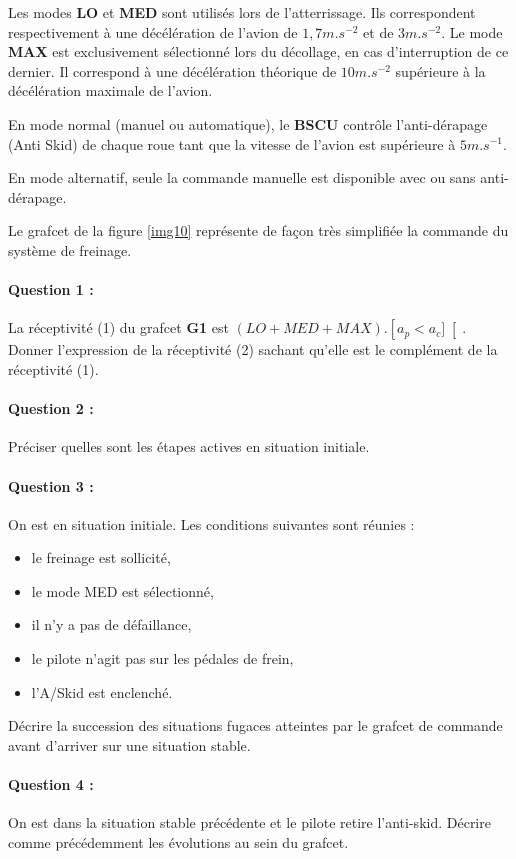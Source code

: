 Les modes \textbf{LO} et \textbf{MED} sont utilisés lors de l'atterrissage. Ils correspondent respectivement à une décélération de l'avion de $1,7m.s^{-2}$ et de $3m.s^{-2}$. Le mode \textbf{MAX} est exclusivement sélectionné lors du décollage, en cas d'interruption de ce dernier. Il correspond à une décélération théorique de $10m.s^{-2}$ supérieure à la décélération maximale de l'avion.

En mode normal (manuel ou automatique), le \textbf{BSCU} contrôle l'anti-dérapage (Anti Skid) de chaque roue tant que la vitesse de l'avion est supérieure à $5m.s^{-1}$.

En mode alternatif, seule la commande manuelle est disponible avec ou sans anti-dérapage.

Le grafcet de la figure \ref{img10} représente de façon très simplifiée la commande du système de freinage.

\paragraph{Question 1 :} La réceptivité (1) du grafcet \textbf{G1} est $(LO+MED+MAX).\left[a_p<a_c]\right[$. Donner l'expression de la réceptivité (2) sachant qu'elle est le complément de la réceptivité (1).

\paragraph{Question 2 :} Préciser quelles sont les étapes actives en situation initiale.

\paragraph{Question 3 :} On est en situation initiale. Les conditions suivantes sont réunies :
\begin{itemize}
 \item le freinage est sollicité,
 \item le mode MED est sélectionné,
 \item il n'y a pas de défaillance,
 \item le pilote n'agit pas sur les pédales de frein,
 \item l'A/Skid est enclenché.
\end{itemize}

Décrire la succession des situations fugaces atteintes par le grafcet de commande avant d'arriver sur une situation stable.

\paragraph{Question 4 :} On est dans la situation stable précédente et le pilote retire l'anti-skid. Décrire comme précédemment les évolutions au sein du grafcet.

